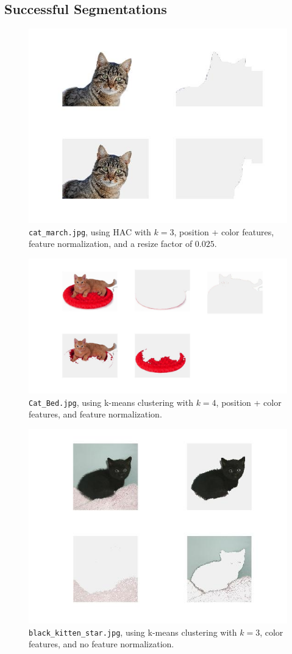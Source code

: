 \documentclass[12pt]{article}
\begin{document}
\subsection{Successful Segmentations}
\begin{figure}[H]
	\centering
	\includegraphics[width=.9\textwidth]{succ1.jpg}
	\caption{\texttt{cat\_march.jpg}, using HAC with $k = 3$, position + color features, feature normalization, and a resize factor of $0.025$.}
\end{figure}

\begin{figure}[H]
	\centering
	\includegraphics[width=.85\textwidth]{succ2.jpg}
	\caption{\texttt{Cat\_Bed.jpg}, using k-means clustering with $k = 4$, position + color features, and feature normalization.}
\end{figure}

\begin{figure}[H]
	\centering
	\includegraphics[width=.7\textwidth]{succ3.jpg}
	\caption{\texttt{black\_kitten\_star.jpg}, using k-means clustering with $k = 3$, color features, and no feature normalization.}
\end{figure}
\end{document}
